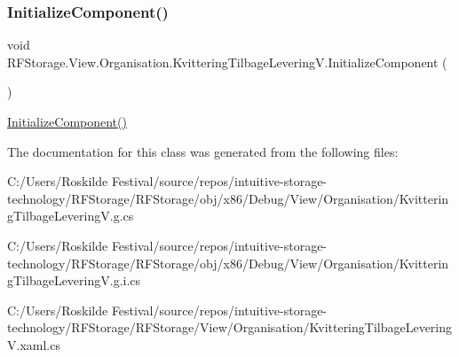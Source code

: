 \subsubsection{\texorpdfstring{InitializeComponent()}{InitializeComponent()}}
{\footnotesize\ttfamily void R\+F\+Storage.\+View.\+Organisation.\+Kvittering\+Tilbage\+Levering\+V.\+Initialize\+Component (\begin{DoxyParamCaption}{ }\end{DoxyParamCaption})}



\mbox{\hyperlink{class_r_f_storage_1_1_view_1_1_organisation_1_1_kvittering_tilbage_levering_v_ac8081ea290369eea79258d4819f6ac6d}{Initialize\+Component()}} 



The documentation for this class was generated from the following files\+:\begin{DoxyCompactItemize}
\item 
C\+:/\+Users/\+Roskilde Festival/source/repos/intuitive-\/storage-\/technology/\+R\+F\+Storage/\+R\+F\+Storage/obj/x86/\+Debug/\+View/\+Organisation/Kvittering\+Tilbage\+Levering\+V.\+g.\+cs\item 
C\+:/\+Users/\+Roskilde Festival/source/repos/intuitive-\/storage-\/technology/\+R\+F\+Storage/\+R\+F\+Storage/obj/x86/\+Debug/\+View/\+Organisation/Kvittering\+Tilbage\+Levering\+V.\+g.\+i.\+cs\item 
C\+:/\+Users/\+Roskilde Festival/source/repos/intuitive-\/storage-\/technology/\+R\+F\+Storage/\+R\+F\+Storage/\+View/\+Organisation/Kvittering\+Tilbage\+Levering\+V.\+xaml.\+cs\end{DoxyCompactItemize}
